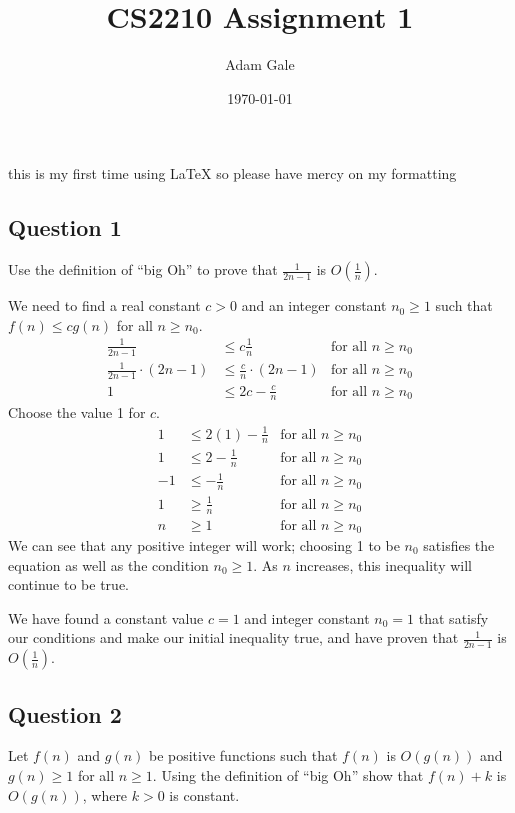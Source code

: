 \documentclass[12pt]{article}
\title{\vspace{-2.5cm}CS2210 Assignment 1}
\author{Adam Gale}
\date{\today}
\begin{document}
    \maketitle
    \footnotesize\begin{center}{this is my first time using \LaTeX{} so please have mercy on my formatting}
    \end{center}
    \normalsize
    \subsection*{Question 1}
        Use the definition of ``big Oh'' to prove that $\frac{1}{2n-1}$ is $O(\frac{1}{n})$.

        We need to find a real constant $c>0$ and an integer constant $n_0\ge1$ such that $f(n)\le cg(n)$ for all $n \ge n_0$.
        \begin{align*}
            \frac{1}{2n-1}&\le c\frac{1}{n} &\text{for all $n\ge n_0$}\\
            \frac{1}{2n-1} \cdot (2n-1)&\le \frac{c}{n} \cdot (2n-1) &\text{for all $n\ge n_0$}\\
            1 &\le 2c-\frac{c}{n} &\text{for all $n\ge n_0$}
        \end{align*}
        Choose the value 1 for $c$.
        \begin{align*}
            1 &\le 2(1)-\frac{1}{n}&\text{for all $n\ge n_0$}\\
            1 &\le 2 -\frac{1}{n}&\text{for all $n\ge n_0$}\\
            -1 &\le -\frac{1}{n}&\text{for all $n\ge n_0$}\\
            1 &\ge \frac{1}{n}&\text{for all $n\ge n_0$}\\
            n &\ge 1&\text{for all $n\ge n_0$}
        \end{align*}
        We can see that any positive integer will work; choosing 1 to be $n_0$ satisfies the equation as well as the condition $n_0\ge1$. As $n$ increases, this inequality will continue to be true.
        
        We have found a constant value $c=1$ and integer constant $n_0=1$ that satisfy our conditions and make our initial inequality true, and have proven that $\frac{1}{2n-1}$ is $O(\frac{1}{n})$.

    \pagebreak

    \subsection*{Question 2}    
        Let $f(n)$ and $g(n)$ be positive functions such that $f(n)$ is $O(g(n))$ and $g(n) \ge 1$ for all $n \ge 1$. Using the definition of ``big Oh'' show that
        $f(n)+k$ is $O(g(n))$, where $k>0$ is constant.
\end{document}

